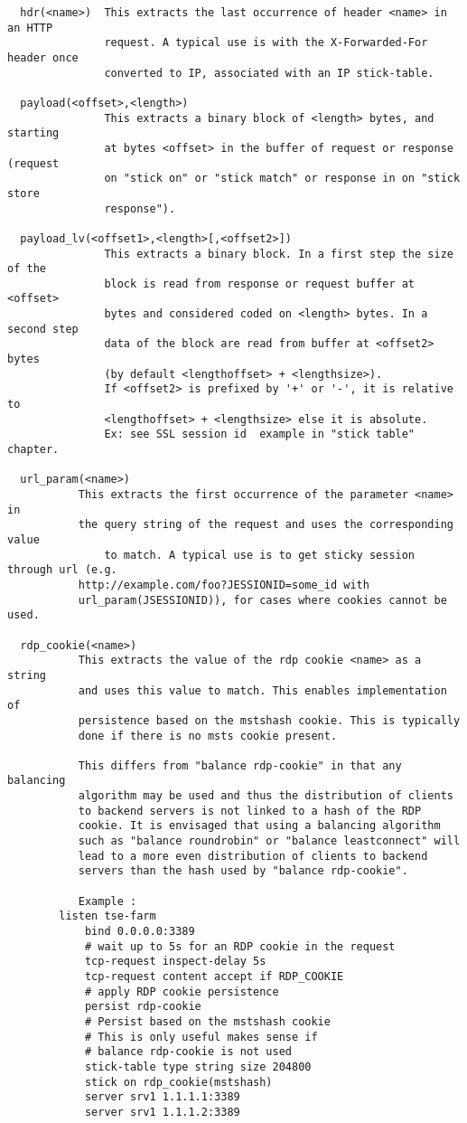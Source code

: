 \begin{verbatim}
  hdr(<name>)  This extracts the last occurrence of header <name> in an HTTP
               request. A typical use is with the X-Forwarded-For header once
               converted to IP, associated with an IP stick-table.

  payload(<offset>,<length>)
               This extracts a binary block of <length> bytes, and starting
               at bytes <offset> in the buffer of request or response (request
               on "stick on" or "stick match" or response in on "stick store
               response").

  payload_lv(<offset1>,<length>[,<offset2>])
               This extracts a binary block. In a first step the size of the
               block is read from response or request buffer at <offset>
               bytes and considered coded on <length> bytes. In a second step
               data of the block are read from buffer at <offset2> bytes
               (by default <lengthoffset> + <lengthsize>).
               If <offset2> is prefixed by '+' or '-', it is relative to
               <lengthoffset> + <lengthsize> else it is absolute.
               Ex: see SSL session id  example in "stick table" chapter.
                
  url_param(<name>)
	       This extracts the first occurrence of the parameter <name> in
	       the query string of the request and uses the corresponding value
               to match. A typical use is to get sticky session through url (e.g.
	       http://example.com/foo?JESSIONID=some_id with
	       url_param(JSESSIONID)), for cases where cookies cannot be used.

  rdp_cookie(<name>)
	       This extracts the value of the rdp cookie <name> as a string
	       and uses this value to match. This enables implementation of
	       persistence based on the mstshash cookie. This is typically
	       done if there is no msts cookie present.

	       This differs from "balance rdp-cookie" in that any balancing
	       algorithm may be used and thus the distribution of clients
	       to backend servers is not linked to a hash of the RDP
	       cookie. It is envisaged that using a balancing algorithm
	       such as "balance roundrobin" or "balance leastconnect" will
	       lead to a more even distribution of clients to backend
	       servers than the hash used by "balance rdp-cookie".

	       Example :
		listen tse-farm
		    bind 0.0.0.0:3389
		    # wait up to 5s for an RDP cookie in the request
		    tcp-request inspect-delay 5s
		    tcp-request content accept if RDP_COOKIE
		    # apply RDP cookie persistence
		    persist rdp-cookie
		    # Persist based on the mstshash cookie
		    # This is only useful makes sense if
		    # balance rdp-cookie is not used
		    stick-table type string size 204800
		    stick on rdp_cookie(mstshash)
		    server srv1 1.1.1.1:3389
		    server srv1 1.1.1.2:3389


\end{verbatim}

